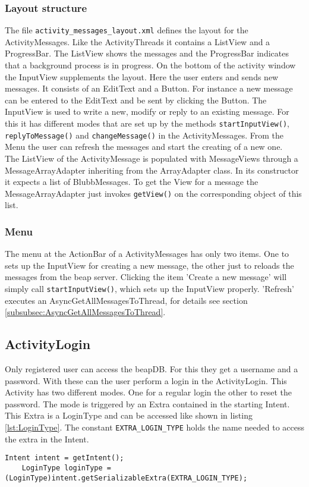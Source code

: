 \documentclass[12pt,a4paper,oneside]{report}
\newcommand{\beapDB}{beapDB}
\newcommand{\beapServer}{beap server}
\newcommand{\code}[1]{\lstinline{#1}}
\begin{document}
\subsubsection{Layout structure}
The file \code{activity_messages_layout.xml} defines the layout for the ActivityMessages. Like the ActivityThreads it contains a ListView and a ProgressBar. The ListView shows the messages and the ProgressBar indicates that a background process is in progress. On the bottom of the activity window the InputView supplements the layout. Here the user enters and sends new messages. It consists of an EditText and a Button. For instance a new message can be entered to the EditText and be sent by clicking the Button. 
The InputView is used to write a new, modify or reply to an existing message. For this it has different modes that are set up by the methods \code{startInputView()}, \code{ replyToMessage()} and \code{changeMessage()} in the ActivityMessages.
From the Menu the user can refresh the messages and start the creating of a new one. \\

The ListView of the ActivityMessage is populated with MessageViews through a MessageArrayAdapter inheriting from the ArrayAdapter class. 
In its constructor it expects a list of BlubbMessages. To get the View for a message the MessageArrayAdapter just invokes \code{getView()} on the corresponding object of this list. 

\subsubsection{Menu}
The menu at the ActionBar of a ActivityMessages has only two items. One to sets up the InputView for creating a new message, the other just to reloads the messages from the \beapServer{}. Clicking the item 'Create a new message' will simply call \code{startInputView()}, which sets up the InputView properly. 'Refresh' executes an AsyncGetAllMessagesToThread, for details see section  \ref{subsubsec:AsyncGetAllMessagesToThread}.

\subsection{ActivityLogin}
Only registered user can access the \beapDB{}. For this they get a username and a password. With these can the user perform a login in the ActivityLogin. This Activity has two different modes. One for a regular login the other to reset the password. The mode is triggered by an Extra contained in the starting Intent. This Extra is a LoginType and can be accessed like shown in listing \ref{lst:LoginType}. The constant \code{EXTRA_LOGIN_TYPE} holds the name needed to access the extra in the Intent.
\lstset{language=java}
\begin{lstlisting}[caption=Accessing the LoginType., label=lst:LoginType]
	Intent intent = getIntent();
    LoginType loginType = (LoginType)intent.getSerializableExtra(EXTRA_LOGIN_TYPE);
\end{lstlisting}
\end{document}
